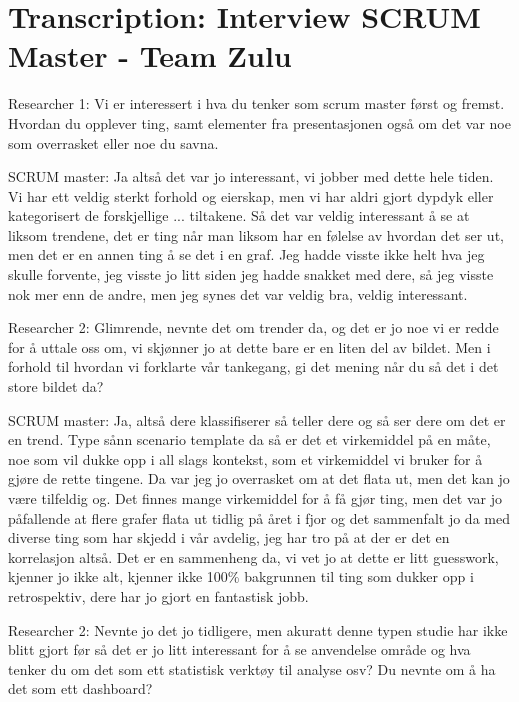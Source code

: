 \documentclass[12pt, a4paper]{report}
\begin{document}
\chapter*{Transcription: Interview SCRUM Master - Team Zulu}
Researcher 1: Vi er interessert i hva du tenker som scrum master først og fremst. Hvordan du opplever ting, samt elementer fra presentasjonen også om det var noe som overrasket eller noe du savna.

SCRUM master: Ja altså det var jo interessant, vi jobber med dette hele tiden. Vi har ett veldig sterkt forhold og eierskap, men vi har aldri gjort dypdyk eller kategorisert de forskjellige ... tiltakene. Så det var veldig interessant å se  at liksom trendene, det er ting når man liksom har en følelse av hvordan det ser ut, men det er en annen ting å se det i en graf. Jeg hadde visste ikke helt hva jeg skulle forvente, jeg visste jo litt siden jeg hadde snakket med dere, så jeg visste nok mer enn de andre, men jeg synes det var veldig bra, veldig interessant.

Researcher 2: Glimrende, nevnte det om trender da, og det er jo noe vi er redde for å uttale oss om, vi skjønner jo at dette bare er en liten del av bildet. Men i forhold til hvordan vi forklarte vår tankegang, gi det mening når du så det i det store bildet da?

SCRUM master: Ja, altså dere klassifiserer så teller dere og så ser dere om det er en trend. Type sånn scenario template da så er det et virkemiddel på en måte, noe som vil dukke opp i all slags kontekst, som et virkemiddel vi bruker for å gjøre de rette tingene. Da var jeg jo overrasket om at det flata ut, men det kan jo være tilfeldig og. Det finnes mange virkemiddel for å få gjør ting, men det var jo påfallende at flere grafer flata ut tidlig på året i fjor og det sammenfalt jo da med diverse ting som har skjedd i vår avdelig, jeg har tro på at der er det en korrelasjon altså. Det er en sammenheng da, vi vet jo at dette er litt guesswork, kjenner jo ikke alt, kjenner ikke 100\% bakgrunnen til ting som dukker opp i retrospektiv, dere har jo gjort en fantastisk jobb.

Researcher 2: Nevnte jo det jo tidligere, men akuratt denne typen studie har ikke blitt gjort før så det er jo litt interessant for å se anvendelse område og hva tenker du om det som ett statistisk verktøy til analyse osv? Du nevnte om å ha det som ett dashboard?
\end{document}

